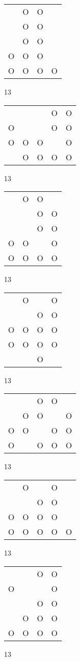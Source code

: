 \begin{tabular}{|m{0.2cm}m{0.2cm}m{0.2cm}m{0.2cm}|}\hline
 &O&O& \\
 &O&O& \\
 &O&O& \\
O&O&O& \\
O&O&O&O\\
\hline\end{tabular}13
\begin{tabular}{|m{0.2cm}m{0.2cm}m{0.2cm}m{0.2cm}m{0.2cm}|}\hline
 & & &O&O\\
O& & &O&O\\
O&O&O& &O\\
 &O&O&O&O\\
\hline\end{tabular}13
\begin{tabular}{|m{0.2cm}m{0.2cm}m{0.2cm}m{0.2cm}|}\hline
 &O&O& \\
 & &O&O\\
 & &O&O\\
O&O& &O\\
O&O&O&O\\
\hline\end{tabular}13
\begin{tabular}{|m{0.2cm}m{0.2cm}m{0.2cm}m{0.2cm}|}\hline
 &O& &O\\
 & &O&O\\
O&O&O&O\\
O&O&O&O\\
 & &O& \\
\hline\end{tabular}13
\begin{tabular}{|m{0.2cm}m{0.2cm}m{0.2cm}m{0.2cm}m{0.2cm}|}\hline
 & &O&O& \\
 &O&O& &O\\
O&O& &O&O\\
O& &O&O&O\\
\hline\end{tabular}13
\begin{tabular}{|m{0.2cm}m{0.2cm}m{0.2cm}m{0.2cm}m{0.2cm}|}\hline
 &O& &O& \\
 & &O&O& \\
O&O&O&O& \\
O&O&O&O&O\\
\hline\end{tabular}13
\begin{tabular}{|m{0.2cm}m{0.2cm}m{0.2cm}m{0.2cm}|}\hline
 & &O&O\\
O& & &O\\
 & &O&O\\
 &O&O&O\\
O&O&O&O\\
\hline\end{tabular}13
